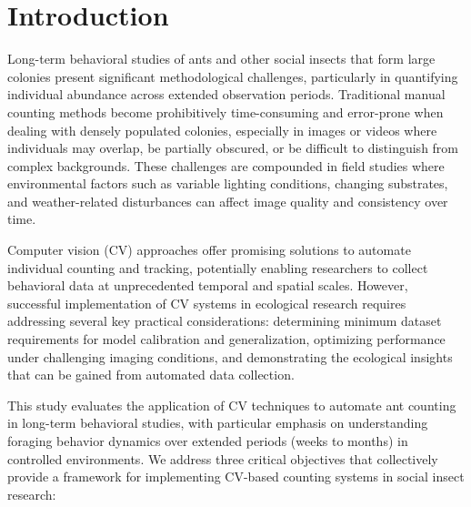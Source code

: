 \section{Introduction}

Long-term behavioral studies of ants and other social insects that form large colonies present significant methodological challenges, particularly in quantifying individual abundance across extended observation periods. Traditional manual counting methods become prohibitively time-consuming and error-prone when dealing with densely populated colonies, especially in images or videos where individuals may overlap, be partially obscured, or be difficult to distinguish from complex backgrounds. These challenges are compounded in field studies where environmental factors such as variable lighting conditions, changing substrates, and weather-related disturbances can affect image quality and consistency over time.

Computer vision (CV) approaches offer promising solutions to automate individual counting and tracking, potentially enabling researchers to collect behavioral data at unprecedented temporal and spatial scales. However, successful implementation of CV systems in ecological research requires addressing several key practical considerations: determining minimum dataset requirements for model calibration and generalization, optimizing performance under challenging imaging conditions, and demonstrating the ecological insights that can be gained from automated data collection.

This study evaluates the application of CV techniques to automate ant counting in long-term behavioral studies, with particular emphasis on understanding foraging behavior dynamics over extended periods (weeks to months) in controlled environments. We address three critical objectives that collectively provide a framework for implementing CV-based counting systems in social insect research:

